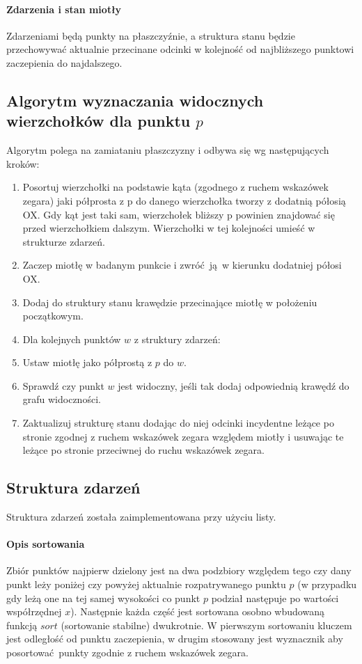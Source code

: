\documentclass[12pt]{article}
\let\tempone\itemize
\let\temptwo\enditemize
\renewenvironment{itemize}{\tempone\setlength{\itemsep}{0cm}}{\temptwo}
\begin{document}
		\paragraph{Zdarzenia i stan miotły}
		Zdarzeniami będą punkty na płaszczyźnie, a struktura stanu będzie przechowywać aktualnie przecinane odcinki w kolejność od najbliższego punktowi zaczepienia do najdalszego.
	
	\subsection{Algorytm wyznaczania widocznych wierzchołków dla punktu $ p $} \label{sssec:algo}
		Algorytm polega na zamiataniu płaszczyzny i odbywa się wg następujących kroków:
		\begin{enumerate}
			\item Posortuj wierzchołki na podstawie kąta (zgodnego z ruchem wskazówek zegara) jaki półprosta z p do danego wierzchołka tworzy z dodatnią półosią OX. Gdy kąt jest taki sam, wierzchołek bliższy p powinien znajdować się przed wierzchołkiem dalszym. Wierzchołki w tej kolejności umieść w strukturze zdarzeń.
			\item Zaczep miotłę w badanym punkcie i zwróć ją w kierunku dodatniej półosi OX.
			\item Dodaj do struktury stanu krawędzie przecinające miotłę w położeniu początkowym.
			\item Dla kolejnych punktów $ w $ z struktury zdarzeń:
			\begin{itemize}
				\item Ustaw miotłę jako półprostą z $ p $ do $ w $.
				\item Sprawdź czy punkt $ w $ jest widoczny, jeśli tak dodaj odpowiednią krawędź do grafu widoczności.
				\item Zaktualizuj strukturę stanu dodając do niej odcinki incydentne leżące po stronie zgodnej z ruchem wskazówek zegara względem miotły i usuwając te leżące po stronie przeciwnej do ruchu wskazówek zegara.
			\end{itemize}
		\end{enumerate}
	
		\subsection{Struktura zdarzeń}
			Struktura zdarzeń została zaimplementowana przy użyciu listy. 
			
			\paragraph{Opis sortowania}
				Zbiór punktów najpierw dzielony jest na dwa podzbiory względem tego czy dany punkt leży poniżej czy powyżej aktualnie rozpatrywanego punktu $ p $ (w przypadku gdy leżą one na tej samej wysokości co punkt $ p $ podział następuje po wartości współrzędnej $ x $). Następnie każda część jest sortowana osobno wbudowaną funkcją $ sort $ (sortowanie stabilne) dwukrotnie. W pierwszym sortowaniu kluczem jest odległość od punktu zaczepienia, w drugim stosowany jest wyznacznik aby posortować punkty zgodnie z ruchem wskazówek zegara.
			
\end{document}

